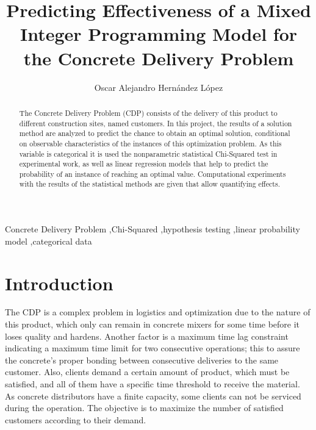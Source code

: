 \documentclass[5p,times]{elsarticle}
\begin{document}
\begin{frontmatter}

\title{Predicting Effectiveness of a Mixed Integer Programming Model for the Concrete Delivery Problem}

\author{Oscar Alejandro Hernández López}
\address{Graduate Program in Systems Engineering, Universidad Autónoma de Nuevo León}

\begin{abstract}
The Concrete Delivery Problem (CDP) consists of the delivery of this product to different construction sites, named customers. In this project, the results of a solution method are analyzed to predict the chance to obtain an optimal solution, conditional on observable characteristics of the instances of this optimization problem.
As this variable is categorical it is used the nonparametric statistical Chi-Squared test in experimental work, as well as linear regression models that help to predict the probability of an instance of reaching an optimal value. Computational experiments with the results of the statistical methods are given that allow quantifying effects. 
\end{abstract}

\begin{keyword}
	Concrete Delivery Problem \sep Chi-Squared \sep hypothesis testing \sep linear probability model \sep categorical data
	
	
	
\end{keyword}

\end{frontmatter}

\section{Introduction}
	The CDP is a complex problem in logistics and optimization due to the nature of this product, which only can remain in concrete mixers for some time before it loses quality and hardens. Another factor is a maximum time lag constraint indicating a maximum time limit for two consecutive operations; this to assure the concrete's proper bonding between consecutive deliveries to the same customer. Also, clients demand a certain amount of product, which must be satisfied, and all of them have a specific time threshold to receive the material. As concrete distributors have a finite capacity, some clients can not be serviced during the operation. The objective is to maximize the number of satisfied customers according to their demand. 
	
\end{document}

